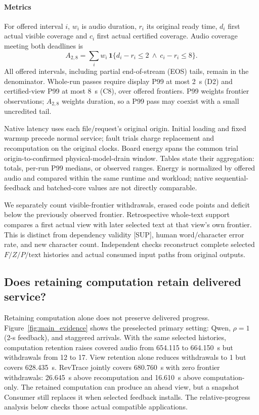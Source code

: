 \paragraph{Metrics}
For offered interval $i$, $w_i$ is audio duration, $r_i$ its original
ready time, $d_i$ first actual visible coverage and $c_i$ first actual
certified coverage. Audio coverage meeting both deadlines is
\begin{equation}
 A_{2,8}=\sum_i w_i\,\mathbf{1}
 \{d_i-r_i\leq2\ \land\ c_i-r_i\leq8\}.
 \label{eq:credit}
\end{equation}
All offered intervals, including partial end-of-stream (EOS) tails,
remain in the denominator. Whole-run passes require display P99 at most
2~s (D2) and certified-view P99 at most 8~s (C8), over offered frontiers.
P99 weights frontier observations; $A_{2,8}$ weights duration, so a P99
pass may coexist with a small uncredited tail.

Native latency uses each file/request's original origin. Initial loading
and fixed warmup precede normal service; fault trials charge replacement
and recomputation on the original clocks. Board energy spans the common trial origin-to-confirmed
physical-model-drain window. Tables state their aggregation: totals,
per-run P99 medians, or observed ranges.
Energy is normalized by offered audio and compared within the same
runtime and workload; native sequential-feedback and batched-core
values are not directly comparable.

We separately count visible-frontier withdrawals, erased code points and
deficit below the previously observed frontier. Retrospective whole-text
support compares a first actual view with later selected text at that
view's own frontier. This is distinct from dependency validity [SUP],
human word/character error rate, and new character count. Independent
checks reconstruct complete selected $F/Z/P/\mathrm{text}$ histories and
actual consumed input paths from original outputs.

\subsection{Does retaining computation retain delivered service?}
Retaining computation alone does not preserve delivered progress.
Figure~\ref{fig:main_evidence} shows the preselected primary setting:
Qwen, $\rho=1$ (2-s feedback), and staggered arrivals. With the same selected histories, computation
retention raises covered audio from 654.115 to 664.150~s but withdrawals
from 12 to 17. View retention alone reduces withdrawals to 1 but covers
628.435~s. RevTrace jointly covers 680.760~s with zero frontier withdrawals:
26.645~s above recomputation and 16.610~s above computation-only.
The retained computation can produce an ahead view, but a snapshot
Consumer still replaces it when selected feedback installs. The
relative-progress analysis below checks those actual compatible
applications.

